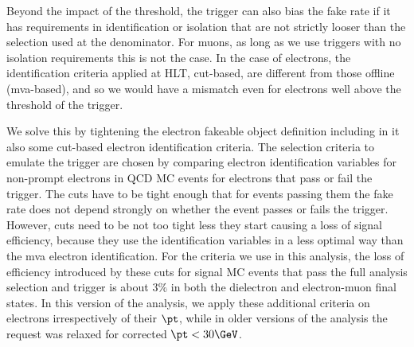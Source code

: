 Beyond the impact of the \pt threshold, the trigger can also bias the fake rate if it has requirements in identification or isolation that are not strictly looser 
than the selection used at the denominator. For muons, as long as we use triggers with no isolation requirements this is not the case. In the case of electrons, the identification criteria applied at HLT, cut-based, are different from those offline (mva-based), and so we would have a mismatch even for electrons well above the \pt threshold of the trigger.

We solve this by tightening the electron fakeable object definition including in it also some cut-based electron identification criteria. The selection criteria to emulate the trigger are chosen by comparing electron identification variables for non-prompt electrons in QCD MC events for electrons that pass or fail the trigger. The cuts have to be tight enough that for events passing them the fake rate does not depend strongly on whether the event passes or fails the trigger. However, cuts need to be not too tight less they start causing a loss of signal efficiency, because they use the identification variables in a less optimal way than the mva electron identification. For the criteria we use in this analysis, the loss of efficiency introduced by these cuts for signal MC events that pass the full analysis selection and trigger is about $3\%$ in both the dielectron and electron-muon final states. In this version of the analysis, we apply these additional criteria on electrons irrespectively of their $\pt$, while in older versions of the analysis the request was relaxed for corrected $\pt < 30\GeV$.  
